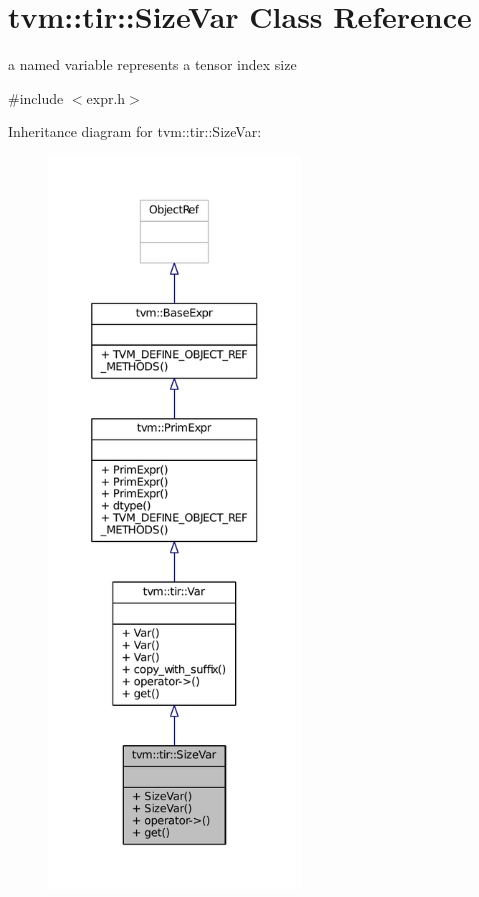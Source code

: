\hypertarget{classtvm_1_1tir_1_1SizeVar}{}\section{tvm\+:\+:tir\+:\+:Size\+Var Class Reference}
\label{classtvm_1_1tir_1_1SizeVar}


a named variable represents a tensor index size  




{\ttfamily \#include $<$expr.\+h$>$}



Inheritance diagram for tvm\+:\+:tir\+:\+:Size\+Var\+:
\nopagebreak
\begin{figure}[H]
\begin{center}
\leavevmode
\includegraphics[height=550pt]{classtvm_1_1tir_1_1SizeVar__inherit__graph}
\end{center}
\end{figure}


